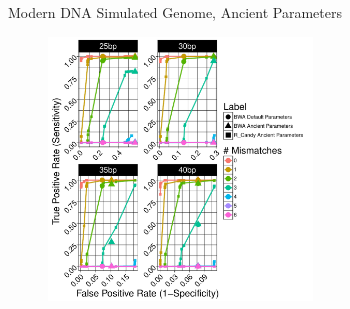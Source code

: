 \documentclass{beamer}
\begin{document}
\begin{frame}{\small{Modern DNA Simulated Genome, Ancient Parameters}}
	\begin{figure}[H]
		\centering
		\includegraphics[width=7cm]{pics/f_DS8_emp.pdf}
		
	\end{figure}

\end{frame}
\end{document}
